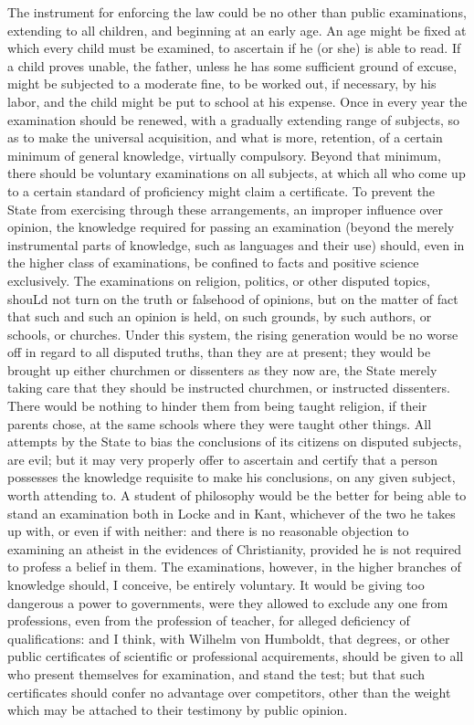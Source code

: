 \documentclass[12pt]{report}
\begin{document}
The instrument for enforcing the law could be no other than public examinations, extending to all children, and beginning at an early age. An age might be fixed at which every child must be examined, to ascertain if he (or she) is able to read. If a child proves unable, the father, unless he has some sufficient ground of excuse, might be subjected to a moderate fine, to be worked out, if necessary, by his labor, and the child might be put to school at his expense. Once in every year the examination should be renewed, with a gradually extending range of subjects, so as to make the universal acquisition, and what is more, retention, of a certain minimum of general knowledge, virtually compulsory. Beyond that minimum, there should be voluntary examinations on all subjects, at which all who come up to a certain standard of proficiency might claim a certificate. To prevent the State from exercising through these arrangements, an improper influence over opinion, the knowledge required for passing an examination (beyond the merely instrumental parts of knowledge, such as languages and their use) should, even in the higher class of examinations, be confined to facts and positive science exclusively. The examinations on religion, politics, or other disputed topics, shouLd not turn on the truth or falsehood of opinions, but on the matter of fact that such and such an opinion is held, on such grounds, by such authors, or schools, or churches. Under this system, the rising generation would be no worse off in regard to all disputed truths, than they are at present; they would be brought up either churchmen or dissenters as they now are, the State merely taking care that they should be instructed churchmen, or instructed dissenters. There would be nothing to hinder them from being taught religion, if their parents chose, at the same schools where they were taught other things. All attempts by the State to bias the conclusions of its citizens on disputed subjects, are evil; but it may very properly offer to ascertain and certify that a person possesses the knowledge requisite to make his conclusions, on any given subject, worth attending to. A student of philosophy would be the better for being able to stand an examination both in Locke and in Kant, whichever of the two he takes up with, or even if with neither: and there is no reasonable objection to examining an atheist in the evidences of Christianity, provided he is not required to profess a belief in them. The examinations, however, in the higher branches of knowledge should, I conceive, be entirely voluntary. It would be giving too dangerous a power to governments, were they allowed to exclude any one from professions, even from the profession of teacher, for alleged deficiency of qualifications: and I think, with Wilhelm von Humboldt, that degrees, or other public certificates of scientific or professional acquirements, should be given to all who present themselves for examination, and stand the test; but that such certificates should confer no advantage over competitors, other than the weight which may be attached to their testimony by public opinion.
\end{document}
